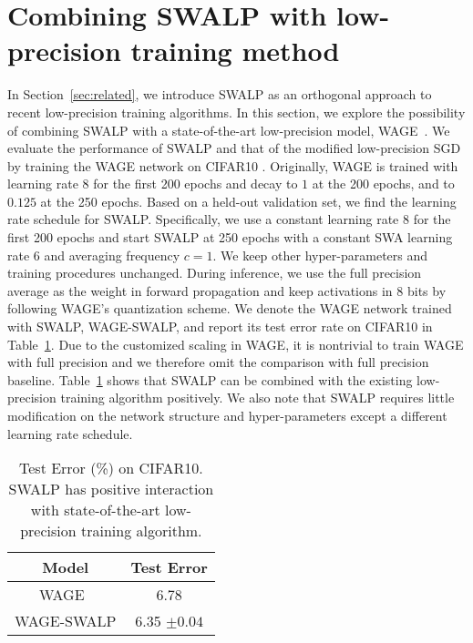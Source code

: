 \section{Combining SWALP with low-precision training method}\label{sec:wage-swalp}
In Section~\ref{sec:related}, we introduce SWALP as an orthogonal approach to recent low-precision training algorithms. In this section, we explore the possibility of combining SWALP with a state-of-the-art low-precision model, WAGE~\cite{WAGE}. 
We evaluate the performance of SWALP and that of the modified low-precision SGD by training the WAGE network on CIFAR10 \cite{WAGE}. 
Originally, WAGE is trained with learning rate $8$ for the first 200 epochs and decay to $1$ at the 200 epochs, and to $0.125$ at the 250 epochs. Based on a held-out validation set, we find the learning rate schedule for SWALP. 
Specifically, we use a constant learning rate $8$ for the first 200 epochs and start SWALP at 250 epochs with a constant SWA learning rate $6$ and averaging frequency $c=1$. 
We keep other hyper-parameters and training procedures unchanged.
During inference, we use the full precision average as the weight in forward propagation and keep activations in 8 bits by following WAGE's quantization scheme.
We denote the WAGE network trained with SWALP, WAGE-SWALP, and report its test error rate on CIFAR10 in Table~\ref{tab:wage-swalp}. 
Due to the customized scaling in WAGE, it is nontrivial to train WAGE with full precision and we therefore omit the comparison with full precision baseline. 
Table~\ref{tab:wage-swalp} shows that SWALP can be combined with the existing low-precision training algorithm positively. We also note that SWALP requires little modification on the network structure and hyper-parameters except a different learning rate schedule.

\begin{table}[H]
    \centering
    \captionsetup{justification=centering}
    \caption{Test Error (\%) on CIFAR10. SWALP has positive interaction with state-of-the-art low-precision training algorithm.}
    \begin{tabular}{cc}
        \toprule
        Model & Test Error  \\
        \midrule
        WAGE~\cite{WAGE} & 6.78 \\
        WAGE-SWALP & 6.35 $\pm{0.04}$ \\
        \bottomrule
    \end{tabular}\label{tab:wage-swalp}
\end{table}
